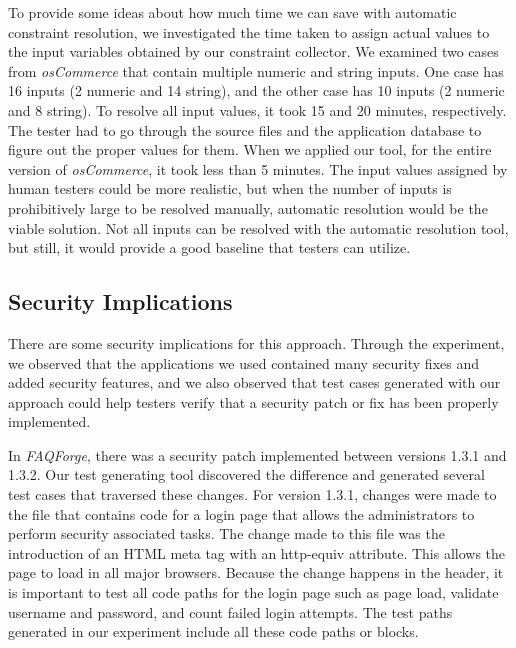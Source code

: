 To provide some ideas about how much time we can save with automatic
constraint resolution, we investigated the time taken to assign
actual values to the input variables obtained by our constraint collector.
We examined two cases from {\em osCommerce} that contain multiple numeric
and string inputs. One case has 16 inputs (2 numeric and 14 string),
and the other case has 10 inputs (2 numeric and 8 string).
To resolve all input values, it took 15 and 20 minutes, 
respectively. The tester had to go through the source files and the 
application database to figure out the proper values for them.
When we applied our tool, for the entire version of {\em osCommerce},
it took less than 5 minutes.
The input values assigned by human testers could be more realistic,
but when the number of inputs is prohibitively large to be resolved 
manually, automatic resolution would be the viable solution.
Not all inputs can be resolved with the automatic resolution tool, but
still, it would provide a good baseline that testers can utilize.

\subsection{Security Implications}

There are some security implications for this approach.
Through the experiment, we observed that the applications we 
used contained many security fixes and added security features,
and we also observed that test cases generated with our approach 
could help testers verify that a security patch or fix has been 
properly implemented.

In {\em FAQForge}, there was a security patch implemented 
between versions 1.3.1 and 1.3.2. Our test generating tool 
discovered the difference and generated several test cases 
that traversed these changes. For version 1.3.1, changes 
were made to the file that contains code for a login page that 
allows the administrators to perform security associated tasks. 
The change made to this file was the introduction of an HTML meta 
tag with an http-equiv attribute. 
This allows the page to load in all major browsers. Because the 
change happens in the header, it is important to test all code 
paths for the login page such as page load, validate username 
and password, and count failed login attempts. The test paths generated 
in our experiment include all these code paths or blocks.

